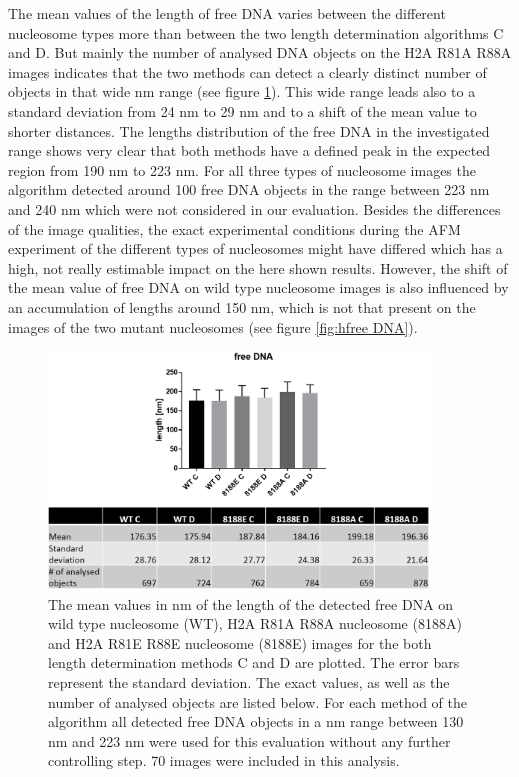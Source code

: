 \documentclass{article}
\begin{document}
The mean values of the length of free DNA varies between the different nucleosome types more than between the two length determination algorithms C and D. But mainly the number of analysed DNA objects on the H2A R81A R88A images indicates that the two methods can detect a clearly distinct number of objects in that wide nm range (see figure \ref{fig:free DNA}). This wide range leads also to a standard deviation from 24 nm to 29 nm and to a shift of the mean value to shorter distances. The lengths distribution of the free DNA in the investigated range shows very clear that both methods have a defined peak in the expected region from 190 nm to 223 nm. For all three types of nucleosome images the algorithm detected around 100 free DNA objects in the range between 223 nm and 240 nm which were not considered in our evaluation. Besides the differences of the image qualities, the exact experimental conditions during the AFM experiment of the different types of nucleosomes might have differed which has a high, not really estimable impact on the here shown results. However, the shift of the mean value of free DNA on wild type nucleosome images is also influenced by an accumulation of lengths around 150 nm, which is not that present on the images of the two mutant nucleosomes (see figure \ref{fig:hfree DNA}). 
%
\begin{figure}[!htb]
	\begin{center}
		\includegraphics[width = 0.9\textwidth]{free_DNA}
	\end{center}
	\caption{The mean values in nm of the length of the detected free DNA on wild type nucleosome (WT), H2A R81A R88A nucleosome (8188A) and H2A R81E R88E nucleosome (8188E) images for the both length determination methods C and D are plotted. The error bars represent the standard deviation. The exact values, as well as the number of analysed objects are listed below. For each method of the algorithm all detected free DNA objects in a nm range between 130 nm and 223 nm were used for this evaluation without any further controlling step. 70 images were included in this analysis.}
	\label{fig:free DNA} %
\end{figure}
\end{document}
